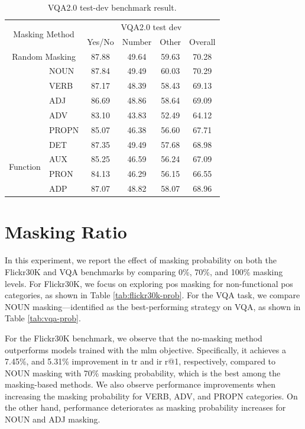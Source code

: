 \begin{table}[H]
    \centering
    \caption{VQA2.0 test-dev benchmark result.}
    \label{tab:vqa}
    \begin{adjustbox}{width=0.6\textwidth}
        \begin{tabular}{ll|cccc}
            \hline
            \multicolumn{2}{c|}{\multirow{2}{*}{Masking Method}} & \multicolumn{4}{c}{VQA2.0 test dev} \\
            & & Yes/No & Number & Other & Overall \\
            \hline
            \multicolumn{2}{c|}{Random Masking} & 87.88 & 49.64 & 59.63 & 70.28 \\
            \hline
            \rowcolor{green}\multirow{5}{*}{Non-function} & NOUN & 87.84 & 49.49 & 60.03 & 70.29 \\
            & VERB & 87.17 & 48.39 & 58.43 & 69.13 \\
            & ADJ & 86.69 & 48.86 & 58.64 & 69.09 \\
            & ADV & 83.10 & 43.83 & 52.49 & 64.12 \\
            & PROPN & 85.07 & 46.38 & 56.60 & 67.71 \\
            \hline
            \multirow{4}{*}{Function} & DET & 87.35 & 49.49 & 57.68 & 68.98 \\
            & AUX & 85.25 & 46.59 & 56.24 & 67.09 \\
            & PRON & 84.13 & 46.29 & 56.15 & 66.55 \\
            & ADP & 87.07 & 48.82 & 58.07 & 68.96 \\
            \hline
        \end{tabular}
    \end{adjustbox}
\end{table}

\section{Masking Ratio}
In this experiment, we report the effect of masking probability on both the Flickr30K and VQA benchmarks by comparing 0\%, 70\%, and 100\% masking levels.
For Flickr30K, we focus on exploring \acrshort{pos} masking for non-functional \acrshort{pos} categories, as shown in Table \ref{tab:flickr30k-prob}.
For the VQA task, we compare NOUN masking—identified as the best-performing strategy on VQA, as shown in Table \ref{tab:vqa-prob}.

For the Flickr30K benchmark, we observe that the no-masking method outperforms models trained with the \acrshort{mlm} objective.
Specifically, it achieves a 7.45\%, and 5.31\% improvement in \acrshort{tr} and \acrshort{ir} r@1, respectively, compared to NOUN masking with 70\% masking probability, which is the best among the masking-based methods.
We also observe performance improvements when increasing the masking probability for VERB, ADV, and PROPN categories.
On the other hand, performance deteriorates as masking probability increases for NOUN and ADJ masking.

